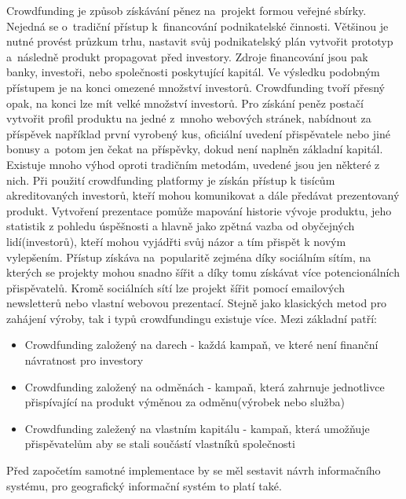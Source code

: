 \documentclass[12pt]{article}%
\begin{document}
{{%
Crowdfunding je způsob získávání pěnez na~projekt formou veřejné sbírky. Nejedná se o~tradiční 
přístup k~financování podnikatelské činnosti. Většinou je nutné provést průzkum trhu, nastavit 
svůj podnikatelský plán vytvořit prototyp a~následně produkt propagovat před investory. Zdroje 
financování jsou pak banky, investoři, nebo společnosti poskytující kapitál. Ve výsledku podobným 
přístupem je na konci omezené množství investorů. Crowdfunding tvoří přesný opak, na konci lze mít 
velké množství investorů. Pro získání peněz postačí vytvořit profil produktu na jedné z~mnoho 
webových stránek, nabídnout za příspěvek například první vyrobený kus, oficiální uvedení 
přispěvatele nebo jiné bonusy a~potom jen čekat na příspěvky, dokud není naplněn základní kapitál.
Existuje mnoho výhod oproti tradičním metodám, uvedené jsou jen některé z nich. Při použití 
crowdfunding platformy je získán přístup k tisícům akreditovaných investorů, kteří mohou 
komunikovat a dále předávat prezentovaný produkt. Vytvoření prezentace pomůže mapování historie 
vývoje produktu, jeho statistik z pohledu úspěšnosti a hlavně jako zpětná vazba od obyčejných 
lidí(investorů), kteří mohou vyjádřti svůj názor a tím přispět k novým vylepšením. Přístup 
získáva na~popularitě zejména díky sociálním sítím, na kterých se projekty mohou snadno šířit 
a díky tomu získávat více potencionálních přispěvatelů. Kromě sociálních sítí lze projekt šířit 
pomocí emailových newsletterů nebo vlastní webovou prezentací. 
Stejně jako klasických metod pro zahájení výroby, tak i typů crowdfundingu existuje více. Mezi 
základní patří:
\begin{itemize}
\item Crowdfunding založený na darech - každá kampaň, ve které není finanční návratnost pro 
investory
\item Crowdfunding založený na odměnách - kampaň, která zahrnuje jednotlivce přispívající 
na produkt výměnou za odměnu(výrobek nebo služba)
\item Crowdfunding zaležený na vlastním kapitálu - kampaň, která umožňuje přispěvatelům aby 
se stali součástí vlastníků společnosti
\end{itemize}

Před započetím samotné implementace by se měl sestavit návrh informačního systému, pro geografický 
informační systém to platí také.

}}
\end{document}
